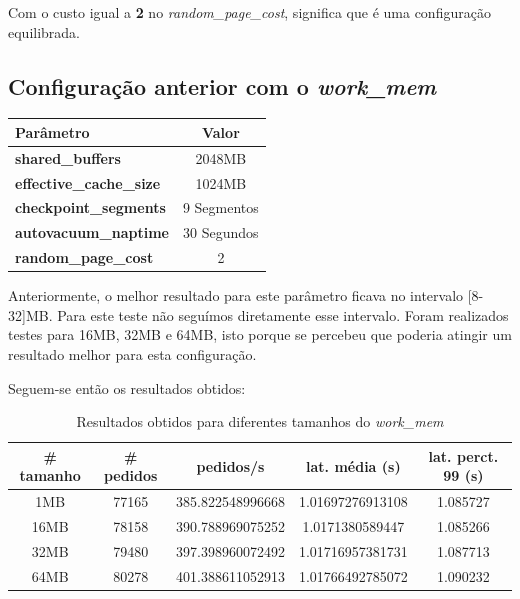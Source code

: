 Com o custo igual a \textbf{2} no \textit{random\_page\_cost}, significa que é uma configuração equilibrada.

\newpage

\subsection{Configuração anterior com o \textit{work\_mem}}

\begin{table}[!h]
\center
\small
\begin{tabular}{|l|c|}
\hline
\textbf{Parâmetro} & \textbf{Valor} \\ \hline
\textbf{shared\_buffers} & 2048MB  \\ \hline
\textbf{effective\_cache\_size} & 1024MB  \\ \hline
\textbf{checkpoint\_segments} & 9 Segmentos \\ \hline
\textbf{autovacuum\_naptime} & 30 Segundos \\ \hline
\textbf{random\_page\_cost} & 2 \\ \hline
\end{tabular}
\end{table}

Anteriormente, o melhor resultado para este parâmetro ficava no intervalo [8-32]MB. Para este teste não seguímos diretamente esse intervalo. Foram realizados testes para 16MB, 32MB e 64MB, isto porque se percebeu que poderia atingir um resultado melhor para esta configuração.

Seguem-se então os resultados obtidos:

\begin{table}[!h]
\center
\small
\begin{tabular}{|c|c|c|c|c|}
\hline
\textbf{\# tamanho} & \textbf{\# pedidos} & \textbf{pedidos/s} & \textbf{lat. média (s)} & \textbf{lat. perct. 99 (s)}  \\ \hline
1MB & 77165 & 385.822548996668 & 1.01697276913108 & 1.085727  \\ \hline
16MB & 78158 & 390.788969075252 & 1.0171380589447 & 1.085266  \\ \hline
32MB & 79480 & 397.398960072492 & 1.01716957381731 & 1.087713  \\ \hline
64MB & 80278 & 401.388611052913 & 1.01766492785072 & 1.090232  \\ \hline
\end{tabular}
\caption{Resultados obtidos para diferentes tamanhos do \textit{work\_mem}}
\end{table}

